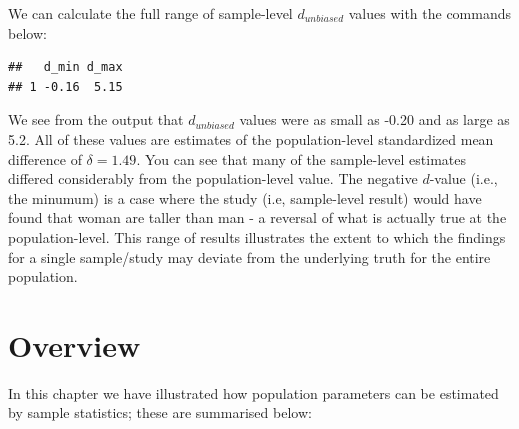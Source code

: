 \documentclass[
]{krantz}
\makeatletter
\newenvironment{Shaded}{\begin{snugshade}}{\end{snugshade}}
\newcommand{\DataTypeTok}[1]{\textcolor[rgb]{0.27,0.27,0.27}{#1}}
\newcommand{\KeywordTok}[1]{\textcolor[rgb]{0.27,0.27,0.27}{\textbf{#1}}}
\newcommand{\NormalTok}[1]{#1}
\newcommand{\OperatorTok}[1]{\textcolor[rgb]{0.43,0.43,0.43}{\textbf{#1}}}
\newcommand{\StringTok}[1]{\textcolor[rgb]{0.5,0.5,0.5}{#1}}
\newenvironment{kframe}{%
\medskip{}
\setlength{\fboxsep}{.8em}
 \def\at@end@of@kframe{}%
 \ifinner\ifhmode%
  \def\at@end@of@kframe{\end{minipage}}%
  \begin{minipage}{\columnwidth}%
 \fi\fi%
 \def\FrameCommand##1{\hskip\@totalleftmargin \hskip-\fboxsep
 \colorbox{shadecolor}{##1}\hskip-\fboxsep
     \hskip-\linewidth \hskip-\@totalleftmargin \hskip\columnwidth}%
 \MakeFramed {\advance\hsize-\width
   \@totalleftmargin\z@ \linewidth\hsize
   \@setminipage}}%
 {\par\unskip\endMakeFramed%
 \at@end@of@kframe}
\renewenvironment{Shaded}{\begin{kframe}}{\end{kframe}}
\makeatother
\begin{document}
We can calculate the full range of sample-level \(d_{unbiased}\) values with the commands below:

\begin{Shaded}
\end{Shaded}

\begin{verbatim}
##   d_min d_max
## 1 -0.16  5.15
\end{verbatim}

We see from the output that \(d_{unbiased}\) values were as small as -0.20 and as large as 5.2. All of these values are estimates of the population-level standardized mean difference of \(\delta = 1.49\). You can see that many of the sample-level estimates differed considerably from the population-level value.
The negative \(d\)-value (i.e., the minumum) is a case where the study (i.e, sample-level result) would have found that woman are taller than man - a reversal of what is actually true at the population-level. This range of results illustrates the extent to which the findings for a single sample/study may deviate from the underlying truth for the entire population.

\hypertarget{overview-1}{%
\section{Overview}\label{overview-1}}

In this chapter we have illustrated how population parameters can be estimated by sample statistics; these are summarised below:

\doublespacing
\end{document}
